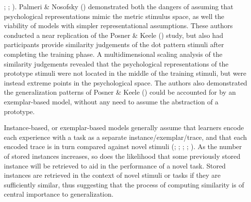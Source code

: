 \documentclass[
  11pt,
  letterpaper,
]{article}
\begin{document}
;
; ). Palmeri \& Nosofsky
() demonstrated
both the dangers of assuming that psychological representations mimic
the metric stimulus space, as well the viability of models with simpler
representational assumptions. These authors conducted a near replication
of the Posner \& Keele
() study, but also
had participants provide similarity judgements of the dot pattern
stimuli after completing the training phase. A multidimensional scaling
analysis of the similarity judgements revealed that the psychological
representations of the prototype stimuli were not located in the middle
of the training stimuli, but were instead extreme points in the
psychological space. The authors also demonstrated the generalization
patterns of Posner \& Keele
() could be accounted
for by an exemplar-based model, without any need to assume the
abstraction of a prototype.

Instance-based, or exemplar-based models generally assume that learners
encode each experience with a task as a separate
instance/exemplar/trace, and that each encoded trace is in turn compared
against novel stimuli
(;
;
; ;
). As the number of stored instances increases, so does the
likelihood that some previously stored instance will be retrieved to aid
in the performance of a novel task. Stored instances are retrieved in
the context of novel stimuli or tasks if they are sufficiently similar,
thus suggesting that the process of computing similarity is of central
importance to generalization.
\end{document}
